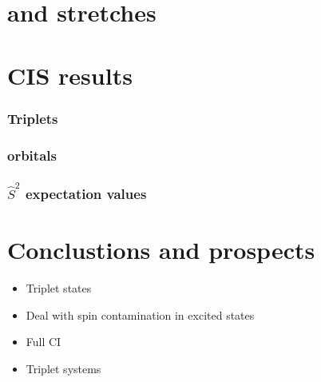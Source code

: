 \documentclass[aspectratio=169]{beamer}
\begin{document}
\section{ and  stretches}


\begin{frame}
    \frametitle{}
\end{frame}

\begin{frame}
    \frametitle{}
\end{frame}


\section{CIS results}

\begin{frame}
    \frametitle{Triplets}

\end{frame}

\begin{frame}
    \frametitle{orbitals}
\end{frame}

\begin{frame}
    \frametitle{$\hat{S}^2$ expectation values}
\end{frame}
\section{Conclustions and prospects}
\begin{frame}
    \begin{itemize}
        \item Triplet states 
        \item Deal with spin contamination in excited states
        \item Full CI
        \item Triplet systems
    \end{itemize}
    
\end{frame}

\titleframe
\end{document}
